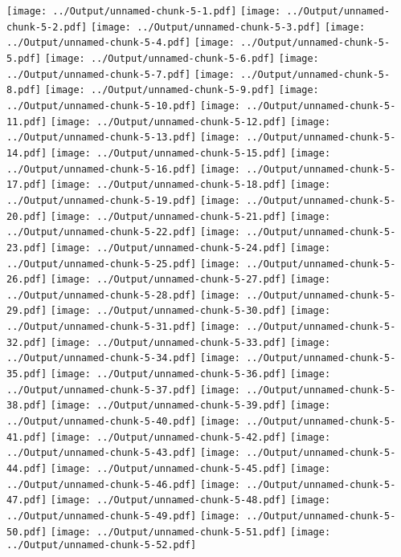 \documentclass[
]{article}
\begin{document}
\texttt{[image: ../Output/unnamed-chunk-5-1.pdf]}
\texttt{[image: ../Output/unnamed-chunk-5-2.pdf]}
\texttt{[image: ../Output/unnamed-chunk-5-3.pdf]}
\texttt{[image: ../Output/unnamed-chunk-5-4.pdf]}
\texttt{[image: ../Output/unnamed-chunk-5-5.pdf]}
\texttt{[image: ../Output/unnamed-chunk-5-6.pdf]}
\texttt{[image: ../Output/unnamed-chunk-5-7.pdf]}
\texttt{[image: ../Output/unnamed-chunk-5-8.pdf]}
\texttt{[image: ../Output/unnamed-chunk-5-9.pdf]}
\texttt{[image: ../Output/unnamed-chunk-5-10.pdf]}
\texttt{[image: ../Output/unnamed-chunk-5-11.pdf]}
\texttt{[image: ../Output/unnamed-chunk-5-12.pdf]}
\texttt{[image: ../Output/unnamed-chunk-5-13.pdf]}
\texttt{[image: ../Output/unnamed-chunk-5-14.pdf]}
\texttt{[image: ../Output/unnamed-chunk-5-15.pdf]}
\texttt{[image: ../Output/unnamed-chunk-5-16.pdf]}
\texttt{[image: ../Output/unnamed-chunk-5-17.pdf]}
\texttt{[image: ../Output/unnamed-chunk-5-18.pdf]}
\texttt{[image: ../Output/unnamed-chunk-5-19.pdf]}
\texttt{[image: ../Output/unnamed-chunk-5-20.pdf]}
\texttt{[image: ../Output/unnamed-chunk-5-21.pdf]}
\texttt{[image: ../Output/unnamed-chunk-5-22.pdf]}
\texttt{[image: ../Output/unnamed-chunk-5-23.pdf]}
\texttt{[image: ../Output/unnamed-chunk-5-24.pdf]}
\texttt{[image: ../Output/unnamed-chunk-5-25.pdf]}
\texttt{[image: ../Output/unnamed-chunk-5-26.pdf]}
\texttt{[image: ../Output/unnamed-chunk-5-27.pdf]}
\texttt{[image: ../Output/unnamed-chunk-5-28.pdf]}
\texttt{[image: ../Output/unnamed-chunk-5-29.pdf]}
\texttt{[image: ../Output/unnamed-chunk-5-30.pdf]}
\texttt{[image: ../Output/unnamed-chunk-5-31.pdf]}
\texttt{[image: ../Output/unnamed-chunk-5-32.pdf]}
\texttt{[image: ../Output/unnamed-chunk-5-33.pdf]}
\texttt{[image: ../Output/unnamed-chunk-5-34.pdf]}
\texttt{[image: ../Output/unnamed-chunk-5-35.pdf]}
\texttt{[image: ../Output/unnamed-chunk-5-36.pdf]}
\texttt{[image: ../Output/unnamed-chunk-5-37.pdf]}
\texttt{[image: ../Output/unnamed-chunk-5-38.pdf]}
\texttt{[image: ../Output/unnamed-chunk-5-39.pdf]}
\texttt{[image: ../Output/unnamed-chunk-5-40.pdf]}
\texttt{[image: ../Output/unnamed-chunk-5-41.pdf]}
\texttt{[image: ../Output/unnamed-chunk-5-42.pdf]}
\texttt{[image: ../Output/unnamed-chunk-5-43.pdf]}
\texttt{[image: ../Output/unnamed-chunk-5-44.pdf]}
\texttt{[image: ../Output/unnamed-chunk-5-45.pdf]}
\texttt{[image: ../Output/unnamed-chunk-5-46.pdf]}
\texttt{[image: ../Output/unnamed-chunk-5-47.pdf]}
\texttt{[image: ../Output/unnamed-chunk-5-48.pdf]}
\texttt{[image: ../Output/unnamed-chunk-5-49.pdf]}
\texttt{[image: ../Output/unnamed-chunk-5-50.pdf]}
\texttt{[image: ../Output/unnamed-chunk-5-51.pdf]}
\texttt{[image: ../Output/unnamed-chunk-5-52.pdf]}
\end{document}
